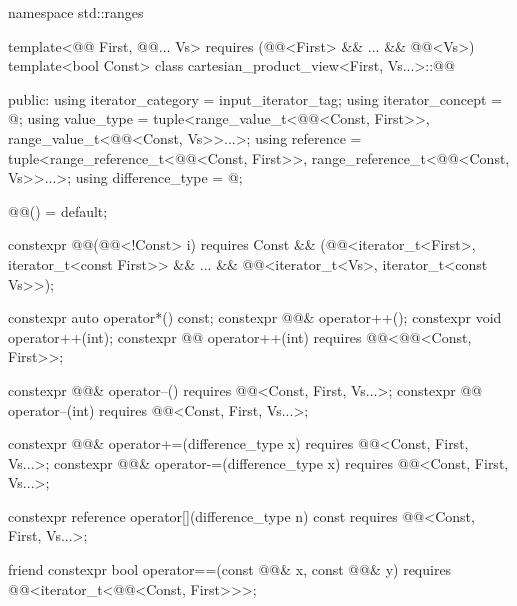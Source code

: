 %
\begin{codeblock}
namespace std::ranges {
  template<@@ First, @@... Vs>
    requires (@@<First> && ... && @@<Vs>)
  template<bool Const>
  class cartesian_product_view<First, Vs...>::@@ {
  public:
    using iterator_category = input_iterator_tag;
    using iterator_concept  = @\seebelow@;
    using value_type = tuple<range_value_t<@@<Const, First>>,
      range_value_t<@@<Const, Vs>>...>;
    using reference = tuple<range_reference_t<@@<Const, First>>,
      range_reference_t<@@<Const, Vs>>...>;
    using difference_type = @\seebelow@;

    @@() = default;

    constexpr @@(@@<!Const> i) requires Const &&
      (@@<iterator_t<First>, iterator_t<const First>> &&
        ... && @@<iterator_t<Vs>, iterator_t<const Vs>>);

    constexpr auto operator*() const;
    constexpr @@& operator++();
    constexpr void operator++(int);
    constexpr @@ operator++(int) requires @@<@@<Const, First>>;

    constexpr @@& operator--()
      requires @@<Const, First, Vs...>;
    constexpr @@ operator--(int)
      requires @@<Const, First, Vs...>;

    constexpr @@& operator+=(difference_type x)
      requires @@<Const, First, Vs...>;
    constexpr @@& operator-=(difference_type x)
      requires @@<Const, First, Vs...>;

    constexpr reference operator[](difference_type n) const
      requires @@<Const, First, Vs...>;

    friend constexpr bool operator==(const @@& x, const @@& y)
      requires @@<iterator_t<@@<Const, First>>>;

}}
\end{codeblock}
